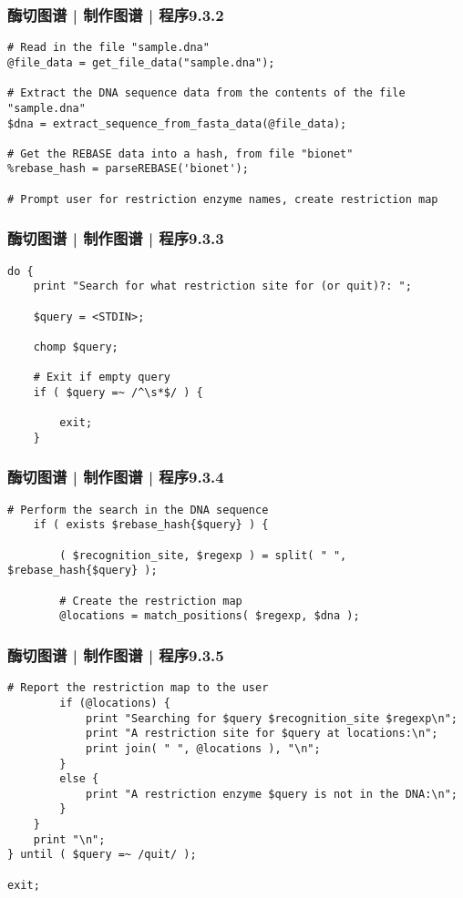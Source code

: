 \begin{frame}[fragile]
  \frametitle{酶切图谱 | 制作图谱 | 程序9.3.2}
  \vspace{-1.5em}
\begin{lstlisting}[firstnumber=17]
# Read in the file "sample.dna"
@file_data = get_file_data("sample.dna");

# Extract the DNA sequence data from the contents of the file "sample.dna"
$dna = extract_sequence_from_fasta_data(@file_data);

# Get the REBASE data into a hash, from file "bionet"
%rebase_hash = parseREBASE('bionet');

# Prompt user for restriction enzyme names, create restriction map
\end{lstlisting}
\end{frame}

\begin{frame}[fragile]
  \frametitle{酶切图谱 | 制作图谱 | 程序9.3.3}
  \vspace{-1.5em}
\begin{lstlisting}[firstnumber=27]
do {
    print "Search for what restriction site for (or quit)?: ";

    $query = <STDIN>;

    chomp $query;

    # Exit if empty query
    if ( $query =~ /^\s*$/ ) {

        exit;
    }
\end{lstlisting}
\end{frame}

\begin{frame}[fragile]
  \frametitle{酶切图谱 | 制作图谱 | 程序9.3.4}
  \vspace{-1.5em}
\begin{lstlisting}[firstnumber=40]
    # Perform the search in the DNA sequence
    if ( exists $rebase_hash{$query} ) {

        ( $recognition_site, $regexp ) = split( " ", $rebase_hash{$query} );

        # Create the restriction map
        @locations = match_positions( $regexp, $dna );
\end{lstlisting}
\end{frame}

\begin{frame}[fragile]
  \frametitle{酶切图谱 | 制作图谱 | 程序9.3.5}
  \vspace{-1.5em}
\begin{lstlisting}[firstnumber=48,basicstyle=\small\tt,numberstyle=\footnotesize]
        # Report the restriction map to the user
        if (@locations) {
            print "Searching for $query $recognition_site $regexp\n";
            print "A restriction site for $query at locations:\n";
            print join( " ", @locations ), "\n";
        }
        else {
            print "A restriction enzyme $query is not in the DNA:\n";
        }
    }
    print "\n";
} until ( $query =~ /quit/ );

exit;
\end{lstlisting}
\end{frame}

